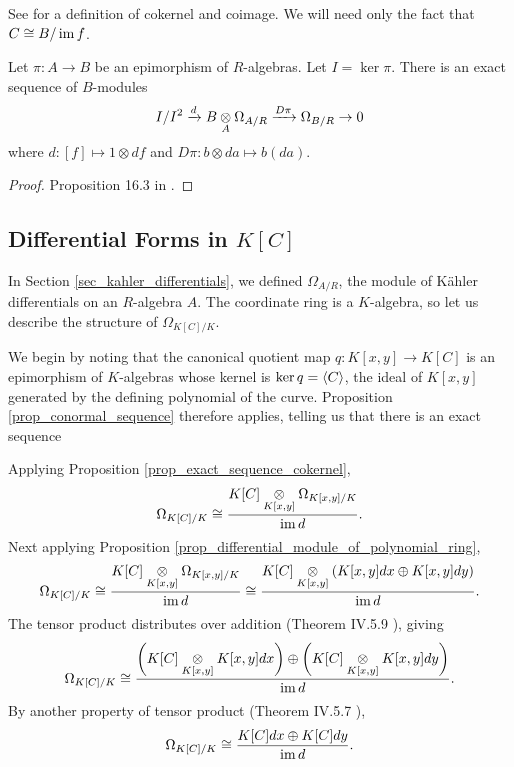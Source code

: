 See \cite{hungerford} for a definition of cokernel and coimage.
We will need only the fact that $C \cong B / \operatorname{im} f$.
\begin{proposition}
  \label{prop_conormal_sequence}
  Let $\pi : A \to B$ be an epimorphism of $R$-algebras.
  Let $I = \ker \pi$.
  There is an exact sequence of $B$-modules
    \[ I/I^2 \xrightarrow{d} B \underset{A}{\otimes} \Omega_{A/R} \xrightarrow{D\pi} \Omega_{B/R} \to 0 \]
  where $d : [f] \mapsto 1 \otimes df$ and $D\pi : b \otimes da \mapsto b(da)$.
\end{proposition}
\begin{proof}
  Proposition 16.3 in \cite{eisenbud95}.
\end{proof}




\subsection{Differential Forms in $K[C]$}
\label{sec_differentials_in_coordinate_ring}

In Section \ref{sec_kahler_differentials}, we defined $\Omega_{A/R}$,
the module of K\"ahler differentials on an $R$-algebra $A$.
The coordinate ring is a $K$-algebra, so let us describe the structure of $\Omega_{K[C]/K}$.

We begin by noting that the canonical quotient map $q : K[x,y] \to K[C]$ is an epimorphism of $K$-algebras
whose kernel is $\ker q = \left\langle C \right\rangle$, the ideal of $K[x,y]$ generated by the defining polynomial of the curve.
Proposition \ref{prop_conormal_sequence} therefore applies, telling us that there is an exact sequence
\begin{center}
\end{center}
Applying Proposition \ref{prop_exact_sequence_cokernel},
\[ \Omega_{K[C]/K} \cong \frac {K[C] \underset{K[x,y]}{\otimes} \Omega_{K[x,y]/K}} {\operatorname{im} d}. \]
Next applying Proposition \ref{prop_differential_module_of_polynomial_ring},
\[ \Omega_{K[C]/K} \cong \frac {K[C] \underset{K[x,y]}{\otimes} \Omega_{K[x,y]/K}} {\operatorname{im} d}
                   \cong \frac {K[C] \underset{K[x,y]}{\otimes} (K[x,y]dx \oplus K[x,y]dy)} {\operatorname{im} d}. \]
The tensor product distributes over addition (Theorem IV.5.9 \cite{hungerford}), giving
\[ \Omega_{K[C]/K} \cong \frac {\left(K[C] \underset{K[x,y]}{\otimes} K[x,y]dx\right) \oplus
                                \left(K[C] \underset{K[x,y]}{\otimes} K[x,y]dy\right)} {\operatorname{im} d}. \]
By another property of tensor product (Theorem IV.5.7 \cite{hungerford}),
\[ \Omega_{K[C]/K} \cong \frac {K[C]dx \oplus K[C]dy} {\operatorname{im} d}. \]

